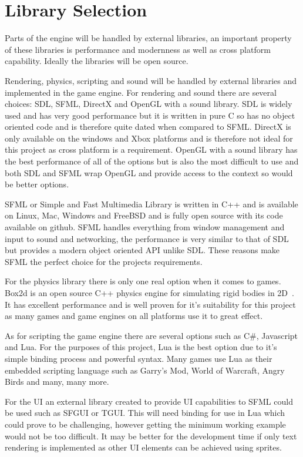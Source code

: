 \documentclass[11pt,a4paper,titlepage]{report}
\begin{document}
\section{Library Selection}

	Parts of the engine will be handled by external libraries, an important property of these libraries is performance and modernness as well as cross platform capability. Ideally the libraries will be open source.

	Rendering, physics, scripting and sound will be handled by external libraries and implemented in the game engine. For rendering and sound there are several choices: SDL, SFML, DirectX and OpenGL with a sound library. SDL is widely used and has very good performance but it is written in pure C so has no object oriented code and is therefore quite dated when compared to SFML. DirectX is only available on the windows and Xbox platforms and is therefore not ideal for this project as cross platform is a requirement. OpenGL with a sound library has the best performance of all of the options but is also the most difficult to use and both SDL and SFML wrap OpenGL and provide access to the context so would be better options.

	SFML or Simple and Fast Multimedia Library is written in C++ and is available on Linux, Mac, Windows and FreeBSD and is fully open source with its code available on github. SFML handles everything from window management and input to sound and networking, the performance is very similar to that of SDL but provides a modern object oriented API unlike SDL. These reasons make SFML the perfect choice for the projects requirements.

	For the physics library there is only one real option when it comes to games. Box2d is an open source C++ physics engine for simulating rigid bodies in 2D~\cite{Box2D}. It has excellent performance and is well proven for it's suitability for this project as many games and game engines on all platforms use it to great effect.

	As for scripting the game engine there are several options such as C\#, Javascript and Lua. For the purposes of this project, Lua is the best option due to it's simple binding process and powerful syntax. Many games use Lua as their embedded scripting language such as Garry's Mod, World of Warcraft, Angry Birds and many, many more.

	For the UI an external library created to provide UI capabilities to SFML could be used such as SFGUI or TGUI. This will need binding for use in Lua which could prove to be challenging, however getting the minimum working example would not be too difficult. It may be better for the development time if only text rendering is implemented as other UI elements can be achieved using sprites.
\end{document}
